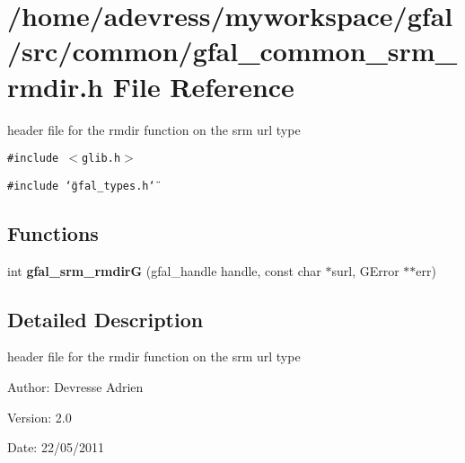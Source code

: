 \section{/home/adevress/myworkspace/gfal/src/common/gfal\_\-common\_\-srm\_\-rmdir.h File Reference}
\label{gfal__common__srm__rmdir_8h}
header file for the rmdir function on the srm url type 

{\tt \#include $<$glib.h$>$}\par
{\tt \#include \char`\"{}gfal\_\-types.h\char`\"{}}\par
\subsection*{Functions}
\begin{CompactItemize}
\item 
int \textbf{gfal\_\-srm\_\-rmdir\-G} (gfal\_\-handle handle, const char $\ast$surl, GError $\ast$$\ast$err)\label{gfal__common__srm__rmdir_8h_4c8ec8a7f1716aa19a83fc94dda6b08e}

\end{CompactItemize}


\subsection{Detailed Description}
header file for the rmdir function on the srm url type 

\begin{Desc}
\item[Author:]Devresse Adrien \end{Desc}
\begin{Desc}
\item[Version:]2.0 \end{Desc}
\begin{Desc}
\item[Date:]22/05/2011 \end{Desc}
